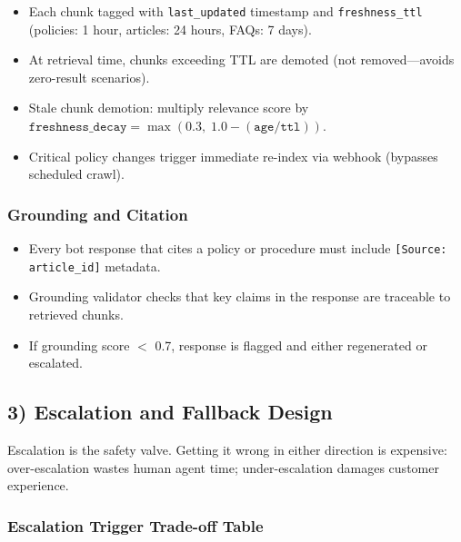 \begin{itemize}
  \item Each chunk tagged with \texttt{last\_updated} timestamp and \texttt{freshness\_ttl} (policies: 1 hour, articles: 24 hours, FAQs: 7 days).
  \item At retrieval time, chunks exceeding TTL are demoted (not removed---avoids zero-result scenarios).
  \item Stale chunk demotion: multiply relevance score by $\texttt{freshness\_decay} = \max(0.3,\; 1.0 - (\texttt{age} / \texttt{ttl}))$.
  \item Critical policy changes trigger immediate re-index via webhook (bypasses scheduled crawl).
\end{itemize}

\subsubsection*{Grounding and Citation}

\begin{itemize}
  \item Every bot response that cites a policy or procedure must include \texttt{[Source: article\_id]} metadata.
  \item Grounding validator checks that key claims in the response are traceable to retrieved chunks.
  \item If grounding score $<$ 0.7, response is flagged and either regenerated or escalated.
\end{itemize}

\subsection*{3) Escalation and Fallback Design}

Escalation is the safety valve. Getting it wrong in either direction is expensive: over-escalation wastes human agent time; under-escalation damages customer experience.

\subsubsection*{Escalation Trigger Trade-off Table}

